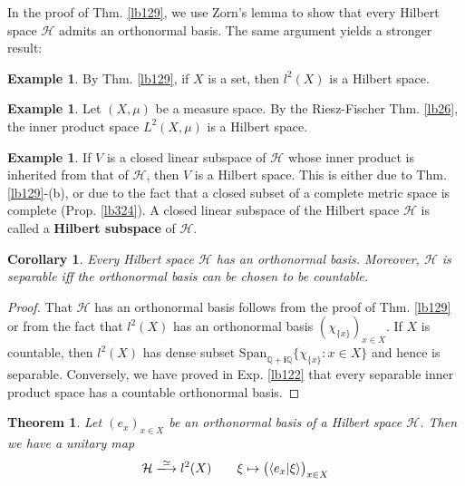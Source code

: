 \documentclass[12pt,b5paper,notitlepage]{article}
\theoremstyle{definition}
\newtheorem{eg}[df]{Example}
\theoremstyle{plain}
\newtheorem{thm}[df]{Theorem}
\newtheorem{co}[df]{Corollary}
\newcommand{\mc}{\mathcal}
\newcommand{\Span}{\mathrm{Span}}
\newcommand{\bk}[1]{\langle {#1}\rangle}
\newcommand{\im}{\mathbf{i}}
\newcommand{\Qbb}{\mathbb Q}
\newcommand{\MH}{\mathcal H}
\numberwithin{equation}{section}
\begin{document}
In the proof of Thm. \ref{lb129}, we use Zorn's lemma to show that every Hilbert space $\MH$ admits an orthonormal basis. The same argument yields a stronger result:






\begin{eg}
By Thm. \ref{lb129}, if $X$ is a set, then $l^2(X)$ is a Hilbert space.
\end{eg}


\begin{eg}
Let $(X,\mu)$ be a measure space. By the Riesz-Fischer Thm. \ref{lb26}, the inner product space $L^2(X,\mu)$ is a Hilbert space.
\end{eg}

\begin{eg}\label{lb148}
If $V$ is a closed linear subspace of $\MH$ whose inner product is inherited from that of $\MH$, then $V$ is a Hilbert space. This is either due to Thm. \ref{lb129}-(b), or due to the fact that a closed subset of a complete metric space is complete (Prop. \ref{lb324}). A closed linear subspace of the Hilbert space $\MH$ is called a \textbf{Hilbert subspace} of $\MH$. 
\end{eg}


\begin{co}\label{lb130}
Every Hilbert space $\mc H$ has an orthonormal basis. Moreover, $\mc H$ is separable iff the orthonormal basis can be chosen to be countable.
\end{co}

\begin{proof}
That $\mc H$ has an orthonormal basis follows from the proof of Thm. \ref{lb129} or from the fact that $l^2(X)$ has an orthonormal basis $(\chi_{\{x\}})_{x\in X}$. If $X$ is countable, then $l^2(X)$ has dense subset $\Span_{\Qbb+\im\Qbb}\{\chi_{\{x\}}:x\in X\}$ and hence is separable. Conversely, we have proved in Exp. \ref{lb122} that every separable inner product space has a countable orthonormal basis.
\end{proof}


\begin{thm}\label{lb131}
Let $(e_x)_{x\in X}$ be an orthonormal basis of a Hilbert space $\mc H$. Then we have a unitary map
\begin{gather}
\mc H\xlongrightarrow{\simeq} l^2(X)\qquad \xi\mapsto\big(\bk{e_x|\xi}\big)_{x\in X}
\end{gather}
\end{thm}
\end{document}
